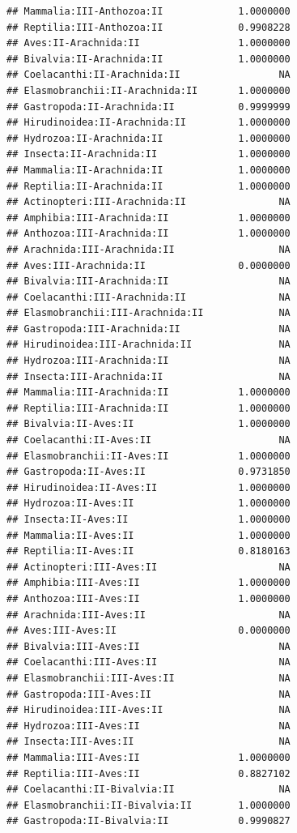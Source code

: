 \documentclass[
  12pt,
]{article}
\begin{document}
\begin{verbatim}
## Mammalia:III-Anthozoa:II             1.0000000
## Reptilia:III-Anthozoa:II             0.9908228
## Aves:II-Arachnida:II                 1.0000000
## Bivalvia:II-Arachnida:II             1.0000000
## Coelacanthi:II-Arachnida:II                 NA
## Elasmobranchii:II-Arachnida:II       1.0000000
## Gastropoda:II-Arachnida:II           0.9999999
## Hirudinoidea:II-Arachnida:II         1.0000000
## Hydrozoa:II-Arachnida:II             1.0000000
## Insecta:II-Arachnida:II              1.0000000
## Mammalia:II-Arachnida:II             1.0000000
## Reptilia:II-Arachnida:II             1.0000000
## Actinopteri:III-Arachnida:II                NA
## Amphibia:III-Arachnida:II            1.0000000
## Anthozoa:III-Arachnida:II            1.0000000
## Arachnida:III-Arachnida:II                  NA
## Aves:III-Arachnida:II                0.0000000
## Bivalvia:III-Arachnida:II                   NA
## Coelacanthi:III-Arachnida:II                NA
## Elasmobranchii:III-Arachnida:II             NA
## Gastropoda:III-Arachnida:II                 NA
## Hirudinoidea:III-Arachnida:II               NA
## Hydrozoa:III-Arachnida:II                   NA
## Insecta:III-Arachnida:II                    NA
## Mammalia:III-Arachnida:II            1.0000000
## Reptilia:III-Arachnida:II            1.0000000
## Bivalvia:II-Aves:II                  1.0000000
## Coelacanthi:II-Aves:II                      NA
## Elasmobranchii:II-Aves:II            1.0000000
## Gastropoda:II-Aves:II                0.9731850
## Hirudinoidea:II-Aves:II              1.0000000
## Hydrozoa:II-Aves:II                  1.0000000
## Insecta:II-Aves:II                   1.0000000
## Mammalia:II-Aves:II                  1.0000000
## Reptilia:II-Aves:II                  0.8180163
## Actinopteri:III-Aves:II                     NA
## Amphibia:III-Aves:II                 1.0000000
## Anthozoa:III-Aves:II                 1.0000000
## Arachnida:III-Aves:II                       NA
## Aves:III-Aves:II                     0.0000000
## Bivalvia:III-Aves:II                        NA
## Coelacanthi:III-Aves:II                     NA
## Elasmobranchii:III-Aves:II                  NA
## Gastropoda:III-Aves:II                      NA
## Hirudinoidea:III-Aves:II                    NA
## Hydrozoa:III-Aves:II                        NA
## Insecta:III-Aves:II                         NA
## Mammalia:III-Aves:II                 1.0000000
## Reptilia:III-Aves:II                 0.8827102
## Coelacanthi:II-Bivalvia:II                  NA
## Elasmobranchii:II-Bivalvia:II        1.0000000
## Gastropoda:II-Bivalvia:II            0.9990827

\end{verbatim}
\end{document}
